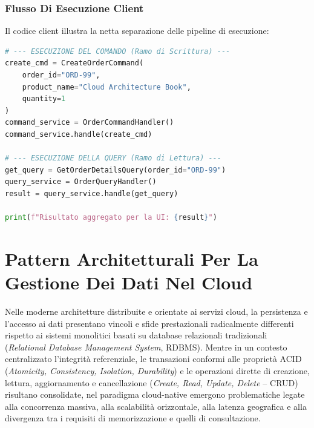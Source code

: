 \documentclass[11pt, a4paper]{article}
\begin{document}
\subsubsection{Flusso Di Esecuzione Client}

Il codice client illustra la netta separazione delle pipeline di esecuzione:

\begin{lstlisting}[language=python]
# --- ESECUZIONE DEL COMANDO (Ramo di Scrittura) ---
create_cmd = CreateOrderCommand(
    order_id="ORD-99",
    product_name="Cloud Architecture Book",
    quantity=1
)
command_service = OrderCommandHandler()
command_service.handle(create_cmd)

# --- ESECUZIONE DELLA QUERY (Ramo di Lettura) ---
get_query = GetOrderDetailsQuery(order_id="ORD-99")
query_service = OrderQueryHandler()
result = query_service.handle(get_query)

print(f"Risultato aggregato per la UI: {result}")
\end{lstlisting}


\section{Pattern Architetturali Per La Gestione Dei Dati Nel Cloud}

Nelle moderne architetture distribuite e orientate ai servizi cloud, la persistenza e l'accesso ai dati presentano vincoli e sfide prestazionali radicalmente differenti rispetto ai sistemi monolitici basati su database relazionali tradizionali (\emph{Relational Database Management System}, RDBMS). Mentre in un contesto centralizzato l'integrità referenziale, le transazioni conformi alle proprietà ACID (\emph{Atomicity, Consistency, Isolation, Durability}) e le operazioni dirette di creazione, lettura, aggiornamento e cancellazione (\emph{Create, Read, Update, Delete} -- CRUD) risultano consolidate, nel paradigma cloud-native emergono problematiche legate alla concorrenza massiva, alla scalabilità orizzontale, alla latenza geografica e alla divergenza tra i requisiti di memorizzazione e quelli di consultazione.
\end{document}

